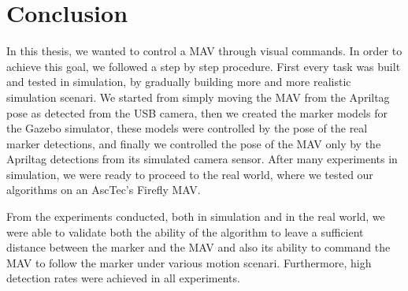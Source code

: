 \chapter{Conclusion}
\label{sec:cocnlusion}

In this thesis, we wanted to control a MAV through visual commands. In order to achieve this goal, we followed a step by step procedure. First every task was built and tested in simulation, by gradually building more and more realistic simulation scenari. We started from simply moving the MAV from the Apriltag pose as detected from the USB camera, then we created the marker models for the Gazebo simulator, these models were controlled by the pose of the real marker detections, and finally we controlled the pose of the MAV only by the Apriltag detections from its simulated camera sensor. After many experiments in simulation, we were ready to proceed to the real world, where we tested our algorithms on an AscTec's Firefly MAV. 

From the experiments conducted, both in simulation and in the real world, we were able to validate both the ability of the algorithm to leave a sufficient distance between the marker and the MAV and also its ability to command the MAV to follow the marker under various motion scenari. Furthermore, high detection rates were achieved in all experiments.
